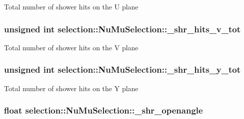 Total number of shower hits on the U plane \hypertarget{classselection_1_1NuMuSelection_aa2d62d528b55bfbb0964fa68f2d0ff04}{
\subsubsection[{\-\_\-shr\-\_\-hits\-\_\-v\-\_\-tot}]{\setlength{\rightskip}{0pt plus 5cm}unsigned int selection\-::\-Nu\-Mu\-Selection\-::\-\_\-shr\-\_\-hits\-\_\-v\-\_\-tot\hspace{0.3cm}{\ttfamily [private]}}}\label{classselection_1_1NuMuSelection_aa2d62d528b55bfbb0964fa68f2d0ff04}
Total number of shower hits on the V plane \hypertarget{classselection_1_1NuMuSelection_a2d08099d9037a3bc8b3b5c7de3de4b4f}{
\subsubsection[{\-\_\-shr\-\_\-hits\-\_\-y\-\_\-tot}]{\setlength{\rightskip}{0pt plus 5cm}unsigned int selection\-::\-Nu\-Mu\-Selection\-::\-\_\-shr\-\_\-hits\-\_\-y\-\_\-tot\hspace{0.3cm}{\ttfamily [private]}}}\label{classselection_1_1NuMuSelection_a2d08099d9037a3bc8b3b5c7de3de4b4f}
Total number of shower hits on the Y plane \hypertarget{classselection_1_1NuMuSelection_ae0b0231c9373f62ab299817893c3d5f4}{
\subsubsection[{\-\_\-shr\-\_\-openangle}]{\setlength{\rightskip}{0pt plus 5cm}float selection\-::\-Nu\-Mu\-Selection\-::\-\_\-shr\-\_\-openangle\hspace{0.3cm}{\ttfamily [private]}}}\label{classselection_1_1NuMuSelection_ae0b0231c9373f62ab299817893c3d5f4}
